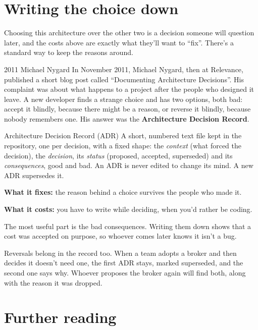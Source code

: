 \section{Writing the choice down}

Choosing this architecture over the other two is a decision someone will
question later, and the costs above are exactly what they'll want to ``fix''.
There's a standard way to keep the reasons around.

\begin{history}{2011 \textperiodcentered{} Michael Nygard}
In November 2011, Michael Nygard, then at Relevance, published a short blog
post called ``Documenting Architecture Decisions''. His complaint was about what
happens to a project after the people who designed it leave. A new developer
finds a strange choice and has two options, both bad: accept it blindly,
because there might be a reason, or reverse it blindly, because nobody
remembers one. His answer was the \textbf{Architecture Decision Record}.
\end{history}

\begin{concept}{Architecture Decision Record (ADR)}
A short, numbered text file kept in the repository, one per decision, with a
fixed shape: the \emph{context} (what forced the decision), the
\emph{decision}, its \emph{status} (proposed, accepted, superseded) and its
\emph{consequences}, good and bad. An ADR is never edited to change its mind. A
new ADR supersedes it.

\textbf{What it fixes:} the reason behind a choice survives the people who made
it.

\textbf{What it costs:} you have to write while deciding, when you'd rather be
coding.
\end{concept}

The most useful part is the bad consequences. Writing them down shows that a
cost was accepted on purpose, so whoever comes later knows it isn't a bug.

Reversals belong in the record too. When a team adopts a broker and then
decides it doesn't need one, the first ADR stays, marked superseded, and the
second one says why. Whoever proposes the broker again will find both, along
with the reason it was dropped.

\section*{Further reading}


